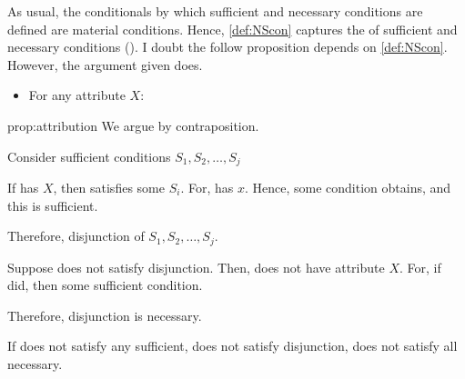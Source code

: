 \begin{note}
  \noindent%
  As usual, the conditionals by which sufficient and necessary conditions are defined are material conditions.
  Hence, \autoref{def:NScon} captures the  of sufficient and necessary conditions
  (\cite[cf.][\S2]{Brennan:2022aa}).
  I doubt the follow proposition depends on \autoref{def:NScon}.
  However, the argument given does.

  \begin{proposition}[Attribution]
    \label{prop:attribution}

    \begin{itemize}
    \item
      For any attribute \(X\):
    \end{itemize}
    \vspace{-\baselineskip}
  \end{proposition}

  \begin{argument}{prop:attribution}
    We argue by contraposition.

    Consider sufficient conditions \(S_{1}, S_{2}, \dots, S_{j}\)

    If \vAgent{} has \(X\), then \vAgent{} satisfies some \(S_{i}\).
    For, \vAgent{} has \(x\).
    Hence, some condition obtains, and this is sufficient.

    Therefore, disjunction of \(S_{1}, S_{2}, \dots, S_{j}\).

    Suppose \vAgent{} does not satisfy disjunction.
    Then, \vAgent{} does not have attribute \(X\).
    For, if did, then some sufficient condition.

    Therefore, disjunction is necessary.

    If does not satisfy any sufficient, does not satisfy disjunction, does not satisfy all necessary.
  \end{argument}
\end{note}

